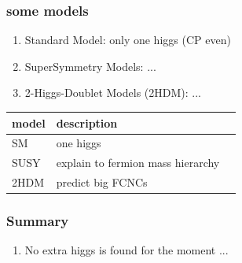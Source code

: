\documentclass[10pt,reqno]{beamer}
\begin{document}
\begin{frame} 



\frametitle{some models}



\begin{enumerate}
\item Standard Model: only one higgs (CP even)
\item SuperSymmetry Models: ...
\item 2-Higgs-Doublet Models (2HDM): ...
\end{enumerate} 



\begin{table}\begin{tabular} {lll} 
 \hline\hline 
 model & description \\ 
\hline
 SM & one higgs \\ 
 SUSY & explain to fermion mass hierarchy \\ 
 2HDM & predict big FCNCs \\ 
\hline\hline 
 \end{tabular}\end{table} 





\end{frame} 

\begin{frame} 



\frametitle{Summary~\label{summary}}



\begin{enumerate}
\item No extra higgs is found for the moment ...
\end{enumerate} 





\end{frame} 
\end{document}
